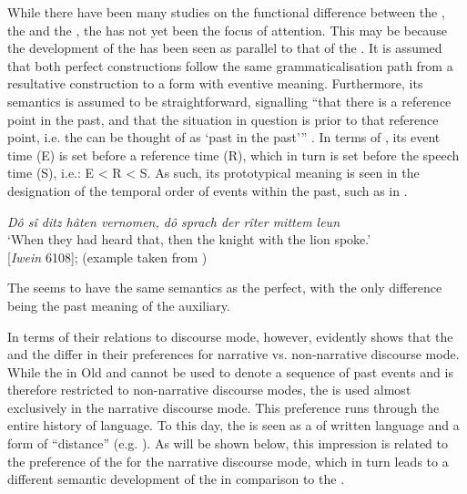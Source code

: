 \documentclass[output=paper,colorlinks,citecolor=brown]{langscibook}
\begin{document}
While there have been many studies on the functional difference between the , the  and the , the  has not yet been the focus of attention. This may be because the development of the  has been seen as parallel to that of the . It is assumed that both perfect constructions follow the same grammaticalisation path from a resultative construction to a  form with eventive meaning. Furthermore, its semantics is assumed to be straightforward, signalling “that there is a reference point in the past, and that the situation in question is prior to that reference point, i.e. the  can be thought of as ‘past in the past'” \citep[65]{Comrie1985}. In terms of \citet{Reichenbach1947}, its event time (E) is set before a reference time (R), which in turn is set before the speech time (S), i.e.: E < R < S. As such, its prototypical meaning is seen in the designation of the temporal order of events within the past, such as in . 

\ea%
\label{ex:zeman:9}
{\itshape Dô sî ditz hâten vernomen, dô sprach der rîter mittem leun\\}
\glt ‘When they had heard that, then the knight with the lion spoke.'\\
\hfill [\textit{Iwein} 6108]; (example taken from \citealt[§ S10]{PaulEtAl2007})
\z 

The  seems to have the same semantics as the perfect, with the only difference being the past meaning of the auxiliary. 

In terms of their relations to discourse mode, however,  evidently shows that the  and the  differ in their preferences for narrative vs. non-narrative discourse mode. While the  in Old and  cannot be used to denote a sequence of past events and is therefore restricted to non-narrative discourse modes, the  is used almost exclusively in the narrative discourse mode. This preference runs through the entire history of language. To this day, the  is seen as a  of written language and a form of “distance” (e.g. \citealt[24]{Luscher2011}). As will be shown below, this impression is related to the preference of the  for the narrative discourse mode, which in turn leads to a different semantic development of the  in comparison to the . 
\end{document}
